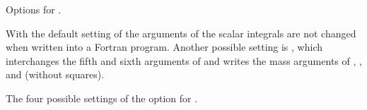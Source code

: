  {Options for .} 

With the default setting  of  the arguments of the 
scalar integrals are not changed when written into a Fortran program.
Another possible setting is , which  interchanges the fifth and sixth arguments
of  and writes the mass arguments of , ,  and 
 (without squares).

 {The four possible settings of the option  for .}



